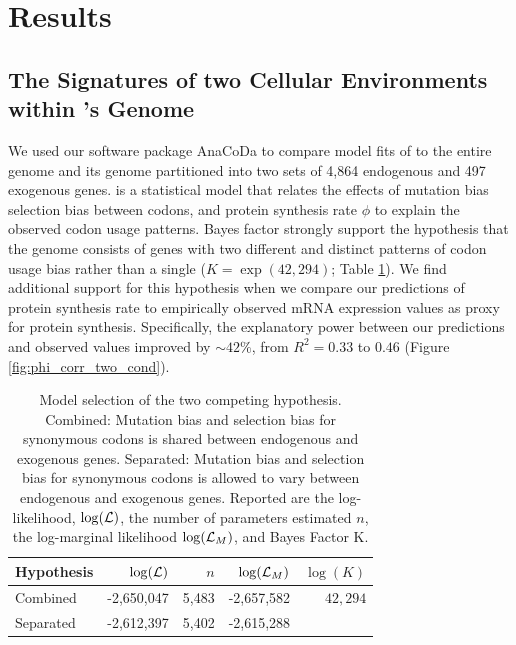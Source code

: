 \documentclass[fleqn,letterpaper]{article}
\begin{document}
\section*{Results}
\subsection*{The Signatures of two Cellular Environments within \kluyveri's Genome}
We used our software package AnaCoDa \citep{landerer2018} to compare model fits of \ROC to the entire \kluyveri genome and its genome partitioned into two sets of 4,864 endogenous and 497 exogenous genes.
\ROC is a statistical model that relates the effects of mutation bias \DM selection bias \DE between codons, and protein synthesis rate $\phi$ to explain the observed codon usage patterns.
Bayes factor strongly support the hypothesis that the \kluyveri genome consists of genes with two different and distinct patterns of codon usage bias rather than a single ($K = \exp(42,294)$; Table \ref{tab:AIC_klu}).
We find additional support for this hypothesis when we compare our predictions of protein synthesis rate to empirically observed mRNA expression values as proxy for protein synthesis.
Specifically, the explanatory power between our predictions and observed values improved by $\sim 42\%$, from $R^2 = 0.33$ to $0.46$ (Figure \ref{fig:phi_corr_two_cond}).

\begin{table}
  \centering
  \caption{Model selection of the two competing hypothesis. 
  Combined: Mutation bias and selection bias for synonymous codons is shared between endogenous and exogenous genes.
  Separated: Mutation bias and selection bias for synonymous codons is allowed to vary between endogenous and exogenous genes.
  Reported are the log-likelihood, $\log(\mathcal{L})$, the number of parameters estimated $n$, the log-marginal likelihood $\log(\mathcal{L}_M)$, and Bayes Factor K.}
  \begin{tabular}{lrrrr}
    \hline
    Hypothesis             & $\log(\mathcal{L})$ &$n$ & $\log(\mathcal{L}_M)$ & $\log(K)$\\ \hline 
    Combined               & -2,650,047 & 5,483 & -2,657,582 & $42,294$\\ 
    Separated		   & -2,612,397 & 5,402 & -2,615,288 &      \\ \hline
  \end{tabular}
  \label{tab:AIC_klu}
\end{table}
\end{document}
